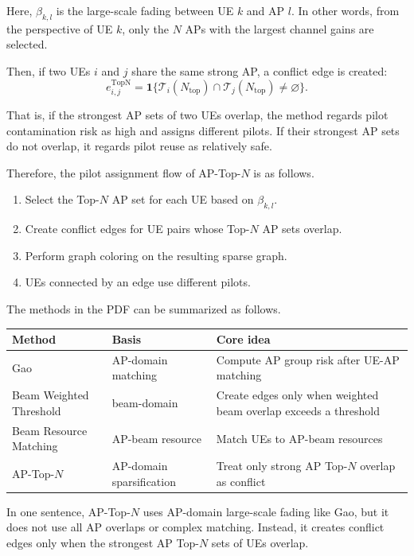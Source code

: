 \documentclass[11pt,a4paper]{article}
\begin{document}
Here, \(\beta_{k,l}\) is the large-scale fading between UE \(k\) and AP \(l\). In other words, from the perspective of UE \(k\), only the \(N\) APs with the largest channel gains are selected.

Then, if two UEs \(i\) and \(j\) share the same strong AP, a conflict edge is created:
\[
    e_{i,j}^{\mathrm{TopN}}
    =
    \mathbf{1}\{
    \mathcal{T}_i(N_{\mathrm{top}})
    \cap
    \mathcal{T}_j(N_{\mathrm{top}})
    \neq \varnothing
    \}.
\]

That is, if the strongest AP sets of two UEs overlap, the method regards pilot contamination risk as high and assigns different pilots. If their strongest AP sets do not overlap, it regards pilot reuse as relatively safe.

Therefore, the pilot assignment flow of AP-Top-\(N\) is as follows.

\begin{enumerate}
    \item Select the Top-\(N\) AP set for each UE based on \(\beta_{k,l}\).
    \item Create conflict edges for UE pairs whose Top-\(N\) AP sets overlap.
    \item Perform graph coloring on the resulting sparse graph.
    \item UEs connected by an edge use different pilots.
\end{enumerate}

The methods in the PDF can be summarized as follows.

\begin{center}
\begin{tabular}{lll}
\toprule
Method & Basis & Core idea\\
\midrule
Gao & AP-domain matching & Compute AP group risk after UE-AP matching\\
Beam Weighted Threshold & beam-domain & Create edges only when weighted beam overlap exceeds a threshold\\
Beam Resource Matching & AP-beam resource & Match UEs to AP-beam resources\\
AP-Top-\(N\) & AP-domain sparsification & Treat only strong AP Top-\(N\) overlap as conflict\\
\bottomrule
\end{tabular}
\end{center}

In one sentence, AP-Top-\(N\) uses AP-domain large-scale fading like Gao, but it does not use all AP overlaps or complex matching. Instead, it creates conflict edges only when the strongest AP Top-\(N\) sets of UEs overlap.
\end{document}
